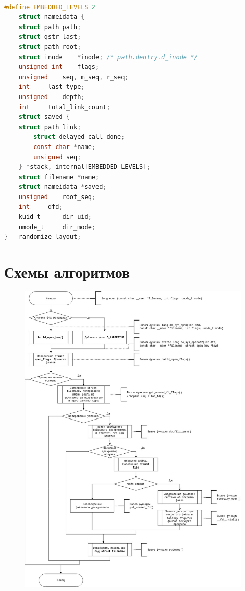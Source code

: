 \documentclass[12pt]{report}
\begin{document}
\begin{lstlisting}[language=c, label=lst:nameidata, caption=Листинг структуры nameidata]

#define EMBEDDED_LEVELS 2
	struct nameidata {
	struct path	path;
	struct qstr	last;
	struct path	root;
	struct inode	*inode; /* path.dentry.d_inode */
	unsigned int	flags;
	unsigned	seq, m_seq, r_seq;
	int		last_type;
	unsigned	depth;
	int		total_link_count;
	struct saved {
	struct path link;
		struct delayed_call done;
		const char *name;
		unsigned seq;
	} *stack, internal[EMBEDDED_LEVELS];
	struct filename	*name;
	struct nameidata *saved;
	unsigned	root_seq;
	int		dfd;
	kuid_t		dir_uid;
	umode_t		dir_mode;
} __randomize_layout;
\end{lstlisting}

\chapter{Схемы алгоритмов}

\begin{figure}[H]
	\centering
	\includegraphics[scale=0.41]{img/open.jpg}
	\label{fig:open}
\end{figure}
\end{document}

